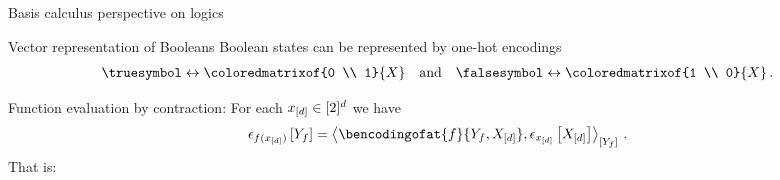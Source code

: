\documentclass{beamer}
\begin{document}

    \begin{frame}{Basis calculus perspective on logics}

        \begin{block}{Vector representation of Booleans}
            Boolean states can be represented by one-hot encodings
            \begin{align*}
                \truesymbol \leftrightarrow \coloredmatrixof{0 \\ 1}{\catvariable}
                \quad \text{and} \quad \falsesymbol \leftrightarrow \coloredmatrixof{1 \\ 0}{\catvariable}\, .
            \end{align*}
        \end{block}

        Function evaluation by contraction: For each $x_{[d]}\in[2]^{d}$ we have
        \begin{align*}
            \onehotmapofat{\exformula(\shortcatindices)}{\headvariableof{\exformula}}
            = \contractionof{
                \bencodingofat{\exformula}{\headvariableof{\exformula},\shortcatvariables},
                \onehotmapofat{\shortcatindices}{\shortcatvariables}
            }{
                \headvariableof{\exformula}
            } \, .
        \end{align*}
        That is:
        \vspace{-0.5cm}


    \end{frame}
\end{document}
